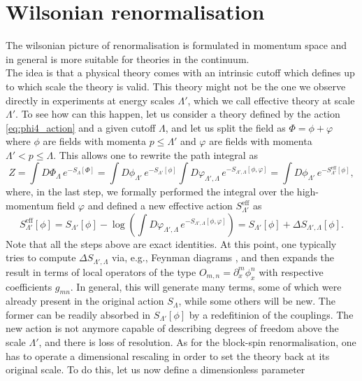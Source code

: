 \section{Wilsonian renormalisation}
\label{sec:wilson_rg}
The wilsonian picture of renormalisation \cite{WilsonRG1,WilsonRG2} is formulated in momentum space and in general is more suitable for theories in the continuum.\\
The idea is that a physical theory comes with an intrinsic cutoff which defines up to which scale the theory is valid. This theory might not be the one
we observe directly in experiments at energy scales $\Lambda'$, which we call effective theory at scale $\Lambda'$. To see how can this happen, let us consider a theory defined by the action \eqref{eq:phi4_action} and a given cutoff $\Lambda$, and let us split the field as $\Phi = \phi + \varphi$ where $\phi$ are fields with momenta $p \leq \Lambda'$ and $\varphi$ are fields with momenta $\Lambda' < p \leq \Lambda$. This allows one to rewrite the path integral as
\begin{equation*}
    Z = \int D\Phi_\Lambda \, e^{-S_\Lambda[\Phi]} = \int D\phi_{\Lambda'} \, e^{-S_{\Lambda'}[\phi]} \int D\varphi_{\Lambda', \Lambda}  \, e^{-S_{\Lambda', \Lambda}[\phi, \varphi]} = \int D\phi_{\Lambda'} \, e^{-S_{\Lambda'}^\text{eff}[\phi]},
\end{equation*}
where, in the last step, we formally performed the integral over the high-momentum field $\varphi$ and defined a new effective action $S^\text{eff}_{\Lambda'}$ as
\begin{equation*}
    S_{\Lambda'}^\text{eff}[\phi] = S_{\Lambda'}[\phi] - \log\left( \int D\varphi_{\Lambda', \Lambda}  \, e^{-S_{\Lambda', \Lambda}[\phi, \varphi]}\right) =  S_{\Lambda'}[\phi] + \Delta S_{\Lambda', \Lambda}[\phi].
\end{equation*}
Note that all the steps above are exact identities. At this point, one typically tries to compute $\Delta S_{\Lambda', \Lambda}$ via, e.g., Feynman diagrams \cite{Peskin:1995ev}, and then expands the result in terms of local operators of the type $O_{m,n} = \partial^m_x\phi^n_x$ with respective coefficients $g_{mn}$. In general, this will generate many terms, some of which were already present in the original action $S_\Lambda$, while some others will be new. The former can be readily absorbed in $S_{\Lambda'}[\phi]$ by a redefitinion of the couplings. 
The new action is not anymore capable of describing degrees of freedom above the scale $\Lambda'$, and there is loss of resolution. As for the block-spin renormalisation, one has to operate a dimensional rescaling in order to set the theory back at its original scale. To do this, let us now define a dimensionless parameter 
